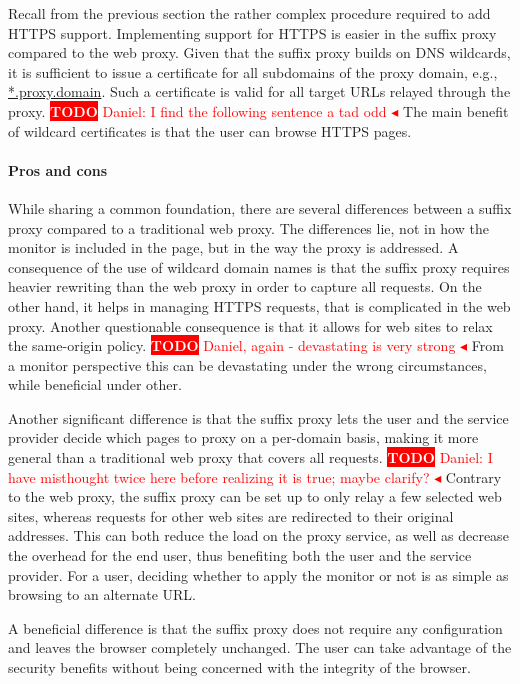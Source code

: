 \documentclass{llncs}
\newcommand{\todo}[1]{\colorbox{red}{\textcolor{white}{\sffamily\bfseries\scriptsize TODO}} \textcolor{red}{#1} \textcolor{red}{$\blacktriangleleft$}}
\begin{document}
Recall from the previous section the rather complex procedure required to add HTTPS support.
Implementing support for HTTPS is easier in the suffix proxy compared to the web proxy. 
Given that the suffix proxy builds on DNS wildcards, it is sufficient to issue a certificate
for all subdomains of the proxy domain, e.g., \url{*.proxy.domain}. Such a 
certificate is valid for all target URLs relayed through the proxy.
\todo{Daniel: I find the following sentence a tad odd}
The main benefit of wildcard certificates is that the user can browse HTTPS pages. 

\paragraph{Pros and cons}

While sharing a common foundation, there are several differences between a 
suffix proxy compared to a traditional web proxy. The differences lie, not in 
how the monitor is included in the page, but in the way the proxy is 
addressed. A consequence of the use of wildcard domain names is that the suffix proxy requires 
heavier rewriting than the web proxy in order to capture all requests. On the other 
hand, it helps in managing HTTPS requests, that is complicated in the web proxy.
Another questionable consequence is that it allows for web sites to relax the 
same-origin policy. 
\todo{Daniel, again - devastating is very strong}
From a monitor perspective this can be devastating under the wrong circumstances, 
while beneficial under other.

Another significant difference is that the suffix proxy lets the user and the 
service provider decide which pages to proxy on a per-domain basis, making it 
more general than a traditional web proxy that covers all requests. 
\todo{Daniel: I have misthought twice here before realizing it is true; maybe clarify?}
Contrary to the web proxy, the suffix proxy can be set up to only relay a few selected 
web sites, whereas requests for other web sites are redirected to their original 
addresses. This can both reduce the load on the proxy service, as well as decrease the 
overhead for the end user, thus benefiting both the user and the service provider.
For a user, deciding whether to apply the monitor or not is as simple as browsing 
to an alternate URL.

A beneficial difference is that the suffix proxy does not require any 
configuration and leaves the browser completely unchanged. The user can take
advantage of the security benefits without being concerned with the integrity 
of the browser.
\end{document}
